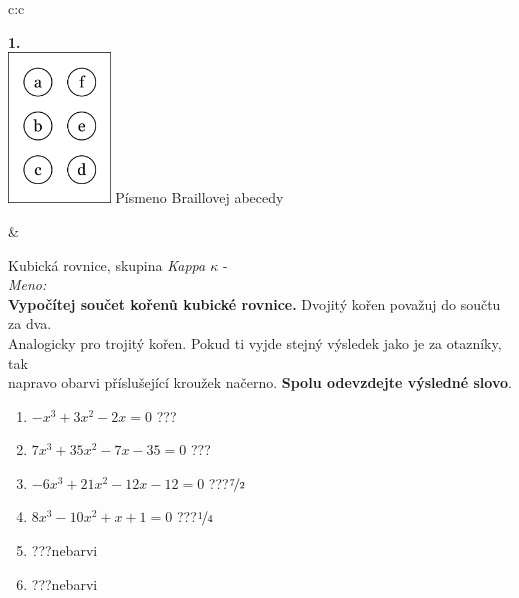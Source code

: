 \documentclass[10pt]{report}
\begin{document}
\begin{tabular}{c:c}
\begin{minipage}[c][99mm][t]{0.49\linewidth}
\begin{center}
\begin{minipage}{0.20\linewidth}
\begin{center}
{\Huge\bfseries 1.} \\[2mm]
\includegraphics[height=40mm]{../images/braille.png}
{\small Písmeno Braillovej abecedy}
\end{center}
\end{minipage}
\end{center}
\end{minipage}
&
\begin{minipage}[c][99mm][t]{0.49\linewidth}
\begin{center}
\vspace{7mm}
{\huge Kubická rovnice, skupina \textit{Kappa $\kappa$} -}\\[4.5mm]
\textit{Meno:}\phantom{xxxxxxxxxxxxxxxxxxxxxxxxxxxxxxxxxxxxxxxxxxxxxxxxxxxxxxxxxxxxxxxxx}\\[3.5mm]
\textbf{Vypočítej součet kořenů kubické rovnice.} Dvojitý kořen považuj do součtu za dva.\\Analogicky pro trojitý kořen. Pokud ti vyjde stejný výsledek jako je za otazníky, tak\\napravo obarvi příslušející kroužek načerno. \textbf{Spolu odevzdejte výsledné slovo}.\\[3mm]
\begin{minipage}{0.77\linewidth}
\begin{center}
\begin{varwidth}{\textwidth}
\begin{enumerate}
\large
\item $-x^3+3x^2-2x=0$\quad \dotfill\; ???\;\dotfill {}
\item $7x^3+35x^2-7x-35=0$\quad \dotfill\; ???\;\dotfill {}
\item $-6x^3+21x^2-12x-12=0$\quad \dotfill\; ???\;\dotfill \quad $\nicefrac{7}{2}$
\item $8x^3-10x^2+x+1=0$\quad \dotfill\; ???\;\dotfill \quad $\nicefrac{1}{4}$
\item \quad \dotfill\; ???\;\dotfill \quad nebarvi
\item \quad \dotfill\; ???\;\dotfill \quad nebarvi
\end{enumerate}
\end{varwidth}

\end{center}
\end{minipage}
\end{center}
\end{minipage}
\end{tabular}
\end{document}
